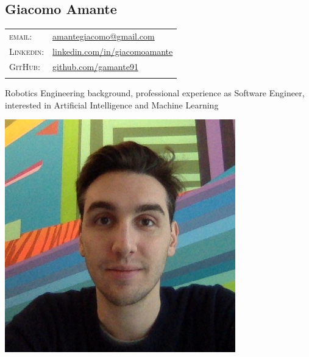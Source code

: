 \documentclass[a4paper,10pt]{article}
\begin{document}
	
	\pagestyle{empty}

	\begin{minipage}{0.75\textwidth}
		\vspace{-10mm}
		\begin{flushleft}
			\section{\Huge Giacomo Amante}
			\vspace{2mm}
			\begin{tabular}{ll}
				\textsc{email:} & \href{mailto:amantegiacomo@gmail.com}{amantegiacomo@gmail.com} \\
				\textsc{Linkedin:} & 
				\href{http://www.linkedin.com/in/giacomoamante}{\color{black}linkedin.com/in/giacomoamante}\\
				\textsc{GitHub:} & \href{https://github.com/gamante91}{github.com/gamante91}\\
				\multicolumn{2}{c}{} \\
			\end{tabular}
		\end{flushleft}
	Robotics Engineering background, professional experience as Software Engineer,\\
	interested in Artificial Intelligence and Machine Learning\\
	\end{minipage}
	\begin{minipage}[c]{0.25\textwidth}
		\begin{center}
			\includegraphics[width=0.75\textwidth]{GiacomoAmante_lowres}
		\end{center}
	\end{minipage}
\end{document}
